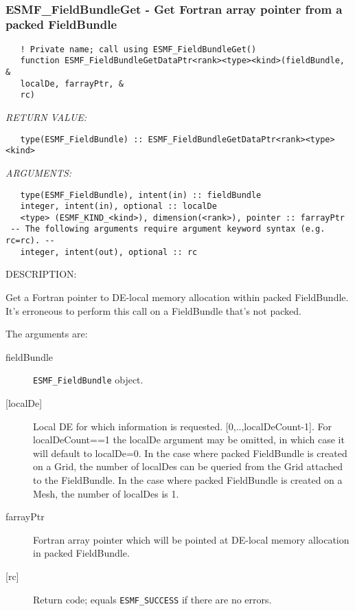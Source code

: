 \mbox{}\hrulefill\ 
 
\subsubsection [ESMF\_FieldBundleGet] {ESMF\_FieldBundleGet - Get Fortran array pointer from a packed FieldBundle }


   
\begin{verbatim}   ! Private name; call using ESMF_FieldBundleGet() 
   function ESMF_FieldBundleGetDataPtr<rank><type><kind>(fieldBundle, & 
   localDe, farrayPtr, & 
   rc) 
   \end{verbatim}{\em RETURN VALUE:}
\begin{verbatim}   type(ESMF_FieldBundle) :: ESMF_FieldBundleGetDataPtr<rank><type><kind> 
   \end{verbatim}{\em ARGUMENTS:}
\begin{verbatim}   type(ESMF_FieldBundle), intent(in) :: fieldBundle 
   integer, intent(in), optional :: localDe 
   <type> (ESMF_KIND_<kind>), dimension(<rank>), pointer :: farrayPtr 
 -- The following arguments require argument keyword syntax (e.g. rc=rc). --
   integer, intent(out), optional :: rc 
   \end{verbatim}
{\sf DESCRIPTION:\\ }

 
   Get a Fortran pointer to DE-local memory allocation within packed FieldBundle. 
   It's erroneous to perform this call on a FieldBundle that's not packed. 
   
   The arguments are: 
   \begin{description} 
   \item [fieldBundle] 
   {\tt ESMF\_FieldBundle} object. 
   \item [{[localDe]}] 
   Local DE for which information is requested. [0,..,localDeCount-1]. 
   For localDeCount==1 the localDe argument may be omitted, 
   in which case it will default to localDe=0. In the case where 
   packed FieldBundle is created on a Grid, the number of localDes can 
   be queried from the Grid attached to the FieldBundle. In the case where 
   packed FieldBundle is created on a Mesh, the number of localDes is 1. 
   \item[farrayPtr] 
   Fortran array pointer which will be pointed at DE-local memory allocation 
   in packed FieldBundle. 
   \item [{[rc]}] 
   Return code; equals {\tt ESMF\_SUCCESS} if there are no errors. 
   \end{description} 
    
